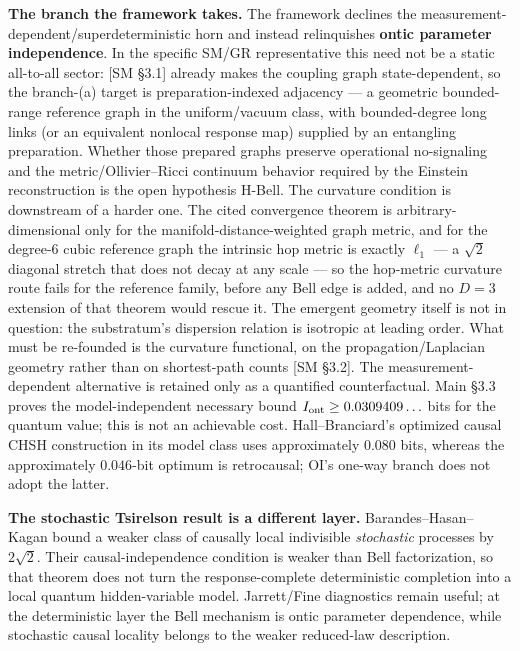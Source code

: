 \documentclass[
]{article}
\begin{document}
\textbf{The branch the framework takes.} The framework declines the
measurement-dependent/superdeterministic horn and instead relinquishes
\textbf{ontic parameter independence}. In the specific SM/GR
representative this need not be a static all-to-all sector: {[}SM
§3.1{]} already makes the coupling graph state-dependent, so the
branch-(a) target is preparation-indexed adjacency --- a geometric
bounded-range reference graph in the uniform/vacuum class, with
bounded-degree long links (or an equivalent nonlocal response map)
supplied by an entangling preparation. Whether those prepared graphs
preserve operational no-signaling and the metric/Ollivier--Ricci
continuum behavior required by the Einstein reconstruction is the open
hypothesis H-Bell. The curvature condition is downstream of a harder
one. The cited convergence theorem is arbitrary-dimensional only for the
manifold-distance-weighted graph metric, and for the degree-\(6\) cubic
reference graph the intrinsic hop metric is exactly \(\ell_1\) --- a
\(\sqrt2\) diagonal stretch that does not decay at any scale --- so the
hop-metric curvature route fails for the reference family, before any
Bell edge is added, and no \(D=3\) extension of that theorem would
rescue it. The emergent geometry itself is not in question: the
substratum's dispersion relation is isotropic at leading order. What
must be re-founded is the curvature functional, on the
propagation/Laplacian geometry rather than on shortest-path counts {[}SM
§3.2{]}. The measurement-dependent alternative is retained only as a
quantified counterfactual. Main §3.3 proves the model-independent
necessary bound \(I_{\rm ont}\ge0.0309409\ldots\) bits for the quantum
value; this is not an achievable cost. Hall--Branciard's optimized
causal CHSH construction in its model class uses approximately \(0.080\)
bits, whereas the approximately \(0.046\)-bit optimum is retrocausal;
OI's one-way branch does not adopt the latter.

\textbf{The stochastic Tsirelson result is a different layer.}
Barandes--Hasan--Kagan bound a weaker class of causally local
indivisible \emph{stochastic} processes by \(2\sqrt2\). Their
causal-independence condition is weaker than Bell factorization, so that
theorem does not turn the response-complete deterministic completion
into a local quantum hidden-variable model. Jarrett/Fine diagnostics
remain useful; at the deterministic layer the Bell mechanism is ontic
parameter dependence, while stochastic causal locality belongs to the
weaker reduced-law description.
\end{document}
